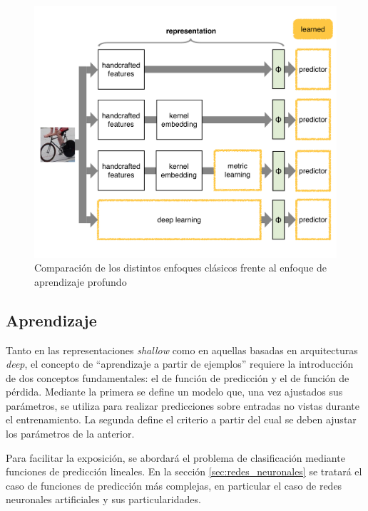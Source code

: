 \documentclass[a4paper,11pt,spanish]{book}
\begin{document}
	\begin{figure}[h]
	  \begin{center}
		  \includegraphics[width=0.9\linewidth]{./img/vedaldi_shallow_deep.pdf}
	  \caption{Comparación de los distintos enfoques clásicos frente al enfoque de aprendizaje profundo}
	  \label{fig:shallow_deep}
	  \end{center}
	\end{figure}

        \subsection{Aprendizaje} \label{sec:aprendizaje}

	  Tanto en las representaciones \emph{shallow} como en aquellas basadas en arquitecturas \emph{deep}, el concepto de ``aprendizaje a
          partir de ejemplos'' requiere la introducción de dos conceptos fundamentales: el de función de predicción y el de función de pérdida. 
          Mediante la primera se define un modelo que, una vez ajustados sus parámetros, se utiliza para realizar predicciones sobre entradas no vistas durante el 
          entrenamiento. La segunda define el criterio a partir del cual se deben ajustar los parámetros de la anterior. 
          
          Para facilitar la exposición, se abordará el problema de clasificación mediante funciones de predicción lineales. 
          En la sección \ref{sec:redes_neuronales} se tratará el caso de funciones de predicción más complejas, en particular el caso de redes neuronales artificiales y
          sus particularidades.
\end{document}
